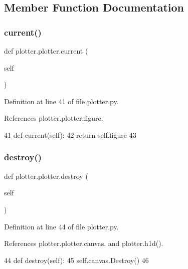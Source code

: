 \subsection{Member Function Documentation}
\mbox{\label{classplotter_1_1plotter_a4c7ba64058a8be7d362958e469429ed6}} 
\subsubsection{\texorpdfstring{current()}{current()}}
{\footnotesize\ttfamily def plotter.\+plotter.\+current (\begin{DoxyParamCaption}\item[{}]{self }\end{DoxyParamCaption})}



Definition at line 41 of file plotter.\+py.



References plotter.\+plotter.\+figure.


\begin{DoxyCode}
41     \textcolor{keyword}{def }current(self):
42             \textcolor{keywordflow}{return} self.figure
43 
\end{DoxyCode}
\mbox{\label{classplotter_1_1plotter_a6bdaaad7796180c8dbe453ea192d982e}} 
\subsubsection{\texorpdfstring{destroy()}{destroy()}}
{\footnotesize\ttfamily def plotter.\+plotter.\+destroy (\begin{DoxyParamCaption}\item[{}]{self }\end{DoxyParamCaption})}



Definition at line 44 of file plotter.\+py.



References plotter.\+plotter.\+canvas, and plotter.\+h1d().


\begin{DoxyCode}
44     \textcolor{keyword}{def }destroy(self):
45         self.canvas.Destroy()
46 
\end{DoxyCode}


